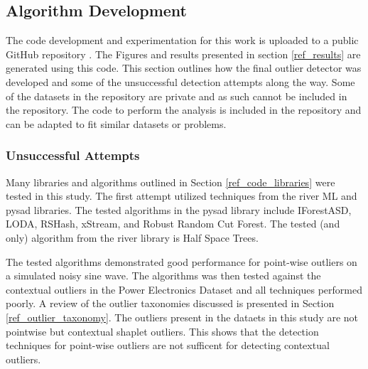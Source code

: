 \subsection{Algorithm Development}

The code development and experimentation for this work is uploaded to a public GitHub repository \parencite{BeattieGithub2022}. The Figures and results presented in section \ref{ref_results} are generated using this code. This section outlines how the final outlier detector was developed and some of the unsuccessful detection attempts along the way. Some of the datasets in the repository are private and as such cannot be included in the repository. The code to perform the analysis is included in the repository and can be adapted to fit similar datasets or problems.

\subsubsection{Unsuccessful Attempts}

Many libraries and algorithms outlined in Section \ref{ref_code_libraries} were tested in this study. The first attempt utilized techniques from the river ML \parencite{2020river} and pysad \parencite{pysad} libraries. The tested algorithms in the pysad library include IForestASD, LODA, RSHash, xStream, and Robust Random Cut Forest. The tested (and only) algorithm from the river library is Half Space Trees.

The tested algorithms demonstrated good performance for point-wise outliers on a simulated noisy sine wave.
The algorithms was then tested against the contextual outliers in the Power Electronics Dataset and all techniques performed poorly.
A review of the outlier taxonomies discussed is presented in Section \ref{ref_outlier_taxonomy}.
The outliers present in the dataets in this study are not pointwise but contextual shaplet outliers.
This shows that the detection techniques for point-wise outliers are not sufficent for detecting contextual outliers.

